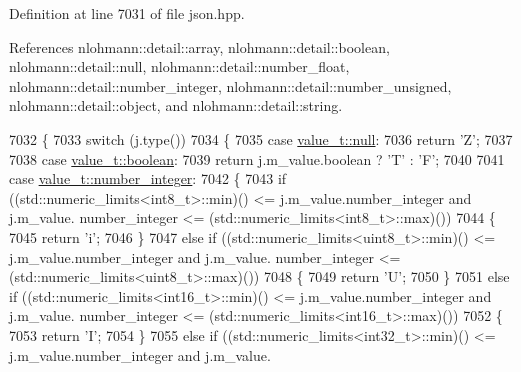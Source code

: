 Definition at line 7031 of file json.\+hpp.



References nlohmann\+::detail\+::array, nlohmann\+::detail\+::boolean, nlohmann\+::detail\+::null, nlohmann\+::detail\+::number\+\_\+float, nlohmann\+::detail\+::number\+\_\+integer, nlohmann\+::detail\+::number\+\_\+unsigned, nlohmann\+::detail\+::object, and nlohmann\+::detail\+::string.


\begin{DoxyCode}
7032     \{
7033         \textcolor{keywordflow}{switch} (j.type())
7034         \{
7035             \textcolor{keywordflow}{case} \hyperlink{namespacenlohmann_1_1detail_a1ed8fc6239da25abcaf681d30ace4985a37a6259cc0c1dae299a7866489dff0bd}{value\_t::null}:
7036                 \textcolor{keywordflow}{return} \textcolor{charliteral}{'Z'};
7037 
7038             \textcolor{keywordflow}{case} \hyperlink{namespacenlohmann_1_1detail_a1ed8fc6239da25abcaf681d30ace4985a84e2c64f38f78ba3ea5c905ab5a2da27}{value\_t::boolean}:
7039                 \textcolor{keywordflow}{return} j.m\_value.boolean ? \textcolor{charliteral}{'T'} : \textcolor{charliteral}{'F'};
7040 
7041             \textcolor{keywordflow}{case} \hyperlink{namespacenlohmann_1_1detail_a1ed8fc6239da25abcaf681d30ace4985a5763da164f8659d94a56e29df64b4bcc}{value\_t::number\_integer}:
7042             \{
7043                 \textcolor{keywordflow}{if} ((std::numeric\_limits<int8\_t>::min)() <= j.m\_value.number\_integer and j.m\_value.
      number\_integer <= (std::numeric\_limits<int8\_t>::max)())
7044                 \{
7045                     \textcolor{keywordflow}{return} \textcolor{charliteral}{'i'};
7046                 \}
7047                 \textcolor{keywordflow}{else} \textcolor{keywordflow}{if} ((std::numeric\_limits<uint8\_t>::min)() <= j.m\_value.number\_integer and j.m\_value.
      number\_integer <= (std::numeric\_limits<uint8\_t>::max)())
7048                 \{
7049                     \textcolor{keywordflow}{return} \textcolor{charliteral}{'U'};
7050                 \}
7051                 \textcolor{keywordflow}{else} \textcolor{keywordflow}{if} ((std::numeric\_limits<int16\_t>::min)() <= j.m\_value.number\_integer and j.m\_value.
      number\_integer <= (std::numeric\_limits<int16\_t>::max)())
7052                 \{
7053                     \textcolor{keywordflow}{return} \textcolor{charliteral}{'I'};
7054                 \}
7055                 \textcolor{keywordflow}{else} \textcolor{keywordflow}{if} ((std::numeric\_limits<int32\_t>::min)() <= j.m\_value.number\_integer and j.m\_value.

\end{DoxyCode}
